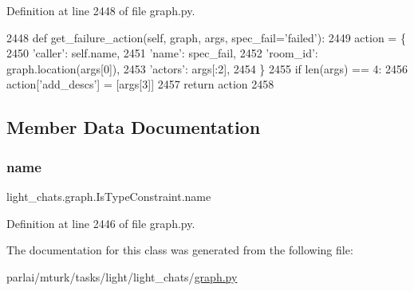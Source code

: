Definition at line 2448 of file graph.\+py.


\begin{DoxyCode}
2448     \textcolor{keyword}{def }get\_failure\_action(self, graph, args, spec\_fail='failed'):
2449         action = \{
2450             \textcolor{stringliteral}{'caller'}: self.name,
2451             \textcolor{stringliteral}{'name'}: spec\_fail,
2452             \textcolor{stringliteral}{'room\_id'}: graph.location(args[0]),
2453             \textcolor{stringliteral}{'actors'}: args[:2],
2454         \}
2455         \textcolor{keywordflow}{if} len(args) == 4:
2456             action[\textcolor{stringliteral}{'add\_descs'}] = [args[3]]
2457         \textcolor{keywordflow}{return} action
2458 
\end{DoxyCode}


\subsection{Member Data Documentation}
\mbox{\label{classlight__chats_1_1graph_1_1IsTypeConstraint_a1378fd0e57416b317a7754d3059a65ff}} 
\subsubsection{\texorpdfstring{name}{name}}
{\footnotesize\ttfamily light\+\_\+chats.\+graph.\+Is\+Type\+Constraint.\+name\hspace{0.3cm}{\ttfamily [static]}}



Definition at line 2446 of file graph.\+py.



The documentation for this class was generated from the following file\+:\begin{DoxyCompactItemize}
\item 
parlai/mturk/tasks/light/light\+\_\+chats/\hyperlink{parlai_2mturk_2tasks_2light_2light__chats_2graph_8py}{graph.\+py}\end{DoxyCompactItemize}
